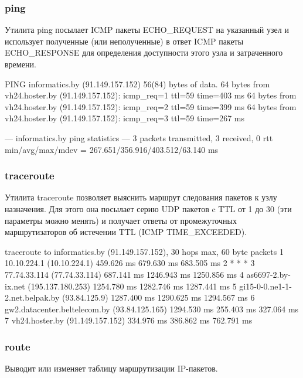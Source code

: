 \subsubsection{ping}
Утилита ping посылает ICMP пакеты ECHO\_REQUEST на указанный узел и использует полученные (или неполученные) в ответ ICMP пакеты ECHO\_RESPONSE для определения доступности этого узла и затраченного времени.
\begin{plainlst}{}{}
PING informatics.by (91.149.157.152) 56(84) bytes of data.
64 bytes from vh24.hoster.by (91.149.157.152): icmp_req=1 ttl=59 time=403 ms
64 bytes from vh24.hoster.by (91.149.157.152): icmp_req=2 ttl=59 time=399 ms
64 bytes from vh24.hoster.by (91.149.157.152): icmp_req=3 ttl=59 time=267 ms

--- informatics.by ping statistics ---
3 packets transmitted, 3 received, 0%
rtt min/avg/max/mdev = 267.651/356.916/403.512/63.140 ms
\end{plainlst}

\subsubsection{traceroute}
Утилита traceroute позволяет выяснить маршрут следования пакетов к узлу назначения. Для этого она посылает серию UDP пакетов c TTL от 1 до 30 (эти параметры можно менять) и получает ответы от промежуточных маршрутизаторов об истечении TTL (ICMP TIME\_EXCEEDED).
\begin{plainlst}{}{}
traceroute to informatics.by (91.149.157.152), 30 hops max, 60 byte packets
 1  10.10.224.1 (10.10.224.1)  459.626 ms  679.630 ms  683.505 ms
 2  * * *
 3  77.74.33.114 (77.74.33.114)  687.141 ms  1246.943 ms  1250.856 ms
 4  as6697-2.by-ix.net (195.137.180.253)  1254.780 ms  1282.746 ms  1287.441 ms
 5  gi15-0-0.ne1-1-2.net.belpak.by (93.84.125.9)  1287.400 ms  1290.625 ms  1294.567 ms
 6  gw2.datacenter.beltelecom.by (93.84.125.165)  1294.530 ms  255.403 ms  327.064 ms
 7  vh24.hoster.by (91.149.157.152)  334.976 ms  386.862 ms  762.791 ms
\end{plainlst}

\subsubsection{route}
Выводит или изменяет таблицу маршрутизации IP-пакетов.
\begin{plainlst}{}{}
\end{plainlst}

